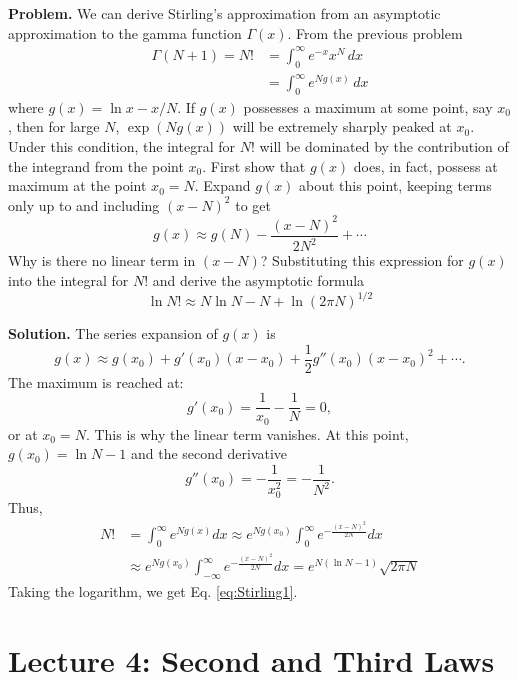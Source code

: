 \documentclass[twocolumn, 10pt]{article}
\numberwithin{equation}{section}
\newenvironment{problem}
{\par\medskip\sffamily \color{problue}
  \textbf{Problem. }\ignorespaces}
{\medskip}
\newenvironment{solution}
{\par\medskip
  \textbf{Solution. }\ignorespaces}
{\medskip}
\begin{document}
\begin{problem}
We can derive Stirling's approximation from
an asymptotic approximation to the gamma function $\Gamma(x)$.
From the previous problem
\begin{align*}
  \Gamma(N+1) = N!
  &= \int_0^\infty e^{-x} x^N \, dx
  \\
  &= \int_0^\infty e^{N g(x)} \, dx
\end{align*}
where $g(x) = \ln x - x/N$.
%
If $g(x)$ possesses a maximum at some point, say $x_0$,
then for large $N$, $\exp(N g(x))$ will be extremely
sharply peaked at $x_0$.
%
Under this condition, the integral for $N!$
will be dominated by the contribution of the integrand
from the point $x_0$.
%
First show that $g(x)$ does, in fact,
possess at maximum at the point $x_0 = N$.
%
Expand $g(x)$ about this point,
keeping terms only up to and including
$(x-N)^2$ to get
$$
g(x) \approx g(N) - \frac{ (x - N)^2 } { 2 N^2 } + \cdots
$$
Why is there no linear term in $(x-N)$?
Substituting this expression for $g(x)$
into the integral for $N!$ and derive the asymptotic formula
\begin{equation}
  \ln N! \approx N \ln N - N + \ln (2\pi N)^{1/2}
  \label{eq:Stirling1}
\end{equation}
\end{problem}

\begin{solution}
The series expansion of $g(x)$ is
$$
  g(x) \approx g(x_0)
  + g'(x_0) (x - x_0)
  + \frac{1}{2} g''(x_0) (x - x_0)^2
  + \cdots.
$$
The maximum is reached at:
$$
  g'(x_0) = \frac{1}{x_0} - \frac{1}{N} = 0,
$$
or at $x_0 = N$.
This is why the linear term vanishes.
%
At this point, $g(x_0) = \ln N - 1$
and the second derivative
$$
  g''(x_0) = -\frac{1}{x_0^2} = -\frac{1}{N^2}.
$$
%
Thus,
\begin{align*}
  N!
  &= \int_0^\infty e^{Ng(x)} dx
  \approx
  e^{Ng(x_0)}
  \int_0^\infty
  e^{- \frac{(x-N)^2}{2N} } dx
  \\
  &\approx
  e^{Ng(x_0)}
  \int_{-\infty}^\infty
  e^{- \frac{(x-N)^2}{2N} } dx
  =
  e^{N(\ln N - 1)} \sqrt{2\pi N}
\end{align*}
%
Taking the logarithm, we get Eq. \eqref{eq:Stirling1}.
\end{solution}

\section{Lecture 4: Second and Third Laws}
\end{document}
